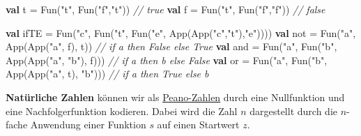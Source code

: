 \documentclass[]{article}
\newenvironment{Shaded}{}{}
\newcommand{\CommentTok}[1]{\textcolor[rgb]{0.38,0.63,0.69}{\textit{#1}}}
\newcommand{\FunctionTok}[1]{\textcolor[rgb]{0.02,0.16,0.49}{#1}}
\newcommand{\KeywordTok}[1]{\textcolor[rgb]{0.00,0.44,0.13}{\textbf{#1}}}
\newcommand{\NormalTok}[1]{#1}
\newcommand{\StringTok}[1]{\textcolor[rgb]{0.25,0.44,0.63}{#1}}
\begin{document}
\begin{Shaded}
\begin{Highlighting}[]
\KeywordTok{val}\NormalTok{ t = }\FunctionTok{Fun}\NormalTok{(}\StringTok{"t"}\NormalTok{, }\FunctionTok{Fun}\NormalTok{(}\StringTok{"f"}\NormalTok{,}\StringTok{"t"}\NormalTok{)) }\CommentTok{// true}
\KeywordTok{val}\NormalTok{ f = }\FunctionTok{Fun}\NormalTok{(}\StringTok{"t"}\NormalTok{, }\FunctionTok{Fun}\NormalTok{(}\StringTok{"f"}\NormalTok{,}\StringTok{"f"}\NormalTok{)) }\CommentTok{// false}

\KeywordTok{val}\NormalTok{ ifTE = }\FunctionTok{Fun}\NormalTok{(}\StringTok{"c"}\NormalTok{, }\FunctionTok{Fun}\NormalTok{(}\StringTok{"t"}\NormalTok{, }\FunctionTok{Fun}\NormalTok{(}\StringTok{"e"}\NormalTok{, }\FunctionTok{App}\NormalTok{(}\FunctionTok{App}\NormalTok{(}\StringTok{"c"}\NormalTok{,}\StringTok{"t"}\NormalTok{),}\StringTok{"e"}\NormalTok{))))}
\KeywordTok{val}\NormalTok{ not = }\FunctionTok{Fun}\NormalTok{(}\StringTok{"a"}\NormalTok{, }\FunctionTok{App}\NormalTok{(}\FunctionTok{App}\NormalTok{(}\StringTok{"a"}\NormalTok{, f), t)) }\CommentTok{// if a then False else True}
\KeywordTok{val}\NormalTok{ and = }\FunctionTok{Fun}\NormalTok{(}\StringTok{"a"}\NormalTok{, }\FunctionTok{Fun}\NormalTok{(}\StringTok{"b"}\NormalTok{, }\FunctionTok{App}\NormalTok{(}\FunctionTok{App}\NormalTok{(}\StringTok{"a"}\NormalTok{, }\StringTok{"b"}\NormalTok{), f))) }\CommentTok{// if a then b else False}
\KeywordTok{val}\NormalTok{ or = }\FunctionTok{Fun}\NormalTok{(}\StringTok{"a"}\NormalTok{, }\FunctionTok{Fun}\NormalTok{(}\StringTok{"b"}\NormalTok{, }\FunctionTok{App}\NormalTok{(}\FunctionTok{App}\NormalTok{(}\StringTok{"a"}\NormalTok{, t), }\StringTok{"b"}\NormalTok{)))  }\CommentTok{// if a then True else b}
\end{Highlighting}
\end{Shaded}

\textbf{Natürliche Zahlen} können wir als
\href{https://de.wikipedia.org/wiki/Peano-Axiome}{Peano-Zahlen} durch
eine Nullfunktion und eine Nachfolgerfunktion kodieren. Dabei wird die
Zahl \(n\) dargestellt durch die \(n\)-fache Anwendung einer Funktion
\(s\) auf einen Startwert \(z\).
\end{document}
